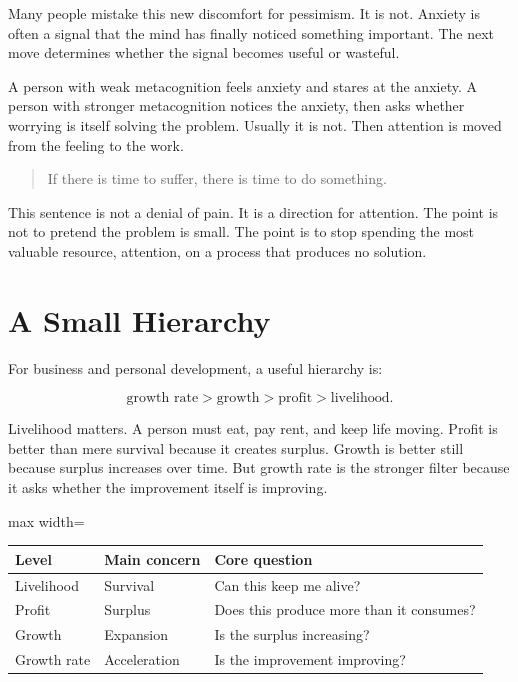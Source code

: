 Many people mistake this new discomfort for pessimism. It is not. Anxiety is often a signal that the mind has finally noticed something important. The next move determines whether the signal becomes useful or wasteful.

A person with weak metacognition feels anxiety and stares at the anxiety. A person with stronger metacognition notices the anxiety, then asks whether worrying is itself solving the problem. Usually it is not. Then attention is moved from the feeling to the work.

\begin{quote}
If there is time to suffer, there is time to do something.
\end{quote}

This sentence is not a denial of pain. It is a direction for attention. The point is not to pretend the problem is small. The point is to stop spending the most valuable resource, attention, on a process that produces no solution.

\section*{A Small Hierarchy}

For business and personal development, a useful hierarchy is:

\[
\text{growth rate} > \text{growth} > \text{profit} > \text{livelihood}.
\]

Livelihood matters. A person must eat, pay rent, and keep life moving. Profit is better than mere survival because it creates surplus. Growth is better still because surplus increases over time. But growth rate is the stronger filter because it asks whether the improvement itself is improving.

\begin{center}
\begin{adjustbox}{max width=\linewidth}
\begin{tabular}{lll}
\hline
Level & Main concern & Core question \\
\hline
Livelihood & Survival & Can this keep me alive? \\
Profit & Surplus & Does this produce more than it consumes? \\
Growth & Expansion & Is the surplus increasing? \\
Growth rate & Acceleration & Is the improvement improving? \\
\hline
\end{tabular}
\end{adjustbox}
\end{center}

